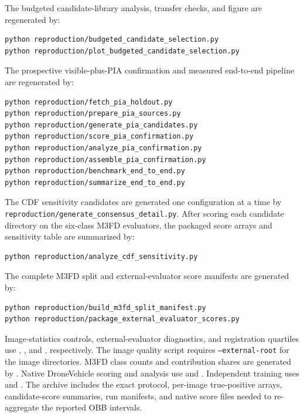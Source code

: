 \documentclass[11pt]{article}
\begin{document}
The budgeted candidate-library analysis, transfer checks, and figure are
regenerated by:

\begin{verbatim}
python reproduction/budgeted_candidate_selection.py
python reproduction/plot_budgeted_candidate_selection.py
\end{verbatim}

The prospective visible-plus-PIA confirmation and measured end-to-end
pipeline are regenerated by:

\begin{verbatim}
python reproduction/fetch_pia_holdout.py
python reproduction/prepare_pia_sources.py
python reproduction/generate_pia_candidates.py
python reproduction/score_pia_confirmation.py
python reproduction/analyze_pia_confirmation.py
python reproduction/assemble_pia_confirmation.py
python reproduction/benchmark_end_to_end.py
python reproduction/summarize_end_to_end.py
\end{verbatim}

The CDF sensitivity candidates are generated one configuration at a time by
\texttt{reproduction/generate\_consensus\_detail.py}. After scoring each
candidate directory on the six-class M3FD evaluators, the packaged score arrays
and sensitivity table are summarized by:

\begin{verbatim}
python reproduction/analyze_cdf_sensitivity.py
\end{verbatim}

The complete M3FD split and external-evaluator score manifests are generated
by:

\begin{verbatim}
python reproduction/build_m3fd_split_manifest.py
python reproduction/package_external_evaluator_scores.py
\end{verbatim}

Image-statistics controls, external-evaluator diagnostics, and registration
quartiles use
,
, and
, respectively. The image
quality script requires \texttt{--external-root} for the image directories.
M3FD class counts and contribution shares are generated by
.
Native DroneVehicle scoring and analysis use
 and
. Independent training
uses  and
. The archive includes
the exact protocol, per-image true-positive arrays, candidate-score summaries,
run manifests, and native score files needed to re-aggregate the reported OBB
intervals.
\end{document}
